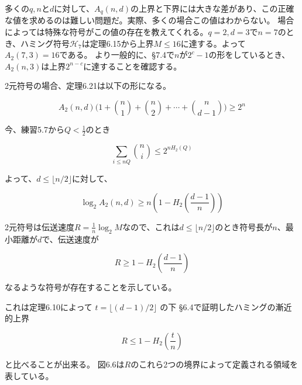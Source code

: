 \documentclass[12pt,a4paper]{article}
\begin{document}
      多くの$q, n$と$d$に対して、$A_q (n, d)$の上界と下界には大きな差があり、この正確な値を求めるのは難しい問題だ。実際、多くの場合この値はわからない。
      場合によっては特殊な符号がこの値の存在を教えてくれる。$q = 2, d = 3$で$n = 7$のとき、ハミング符号$\mathcal{H}_7$は定理6.15から上界$M \leq 16$に達する。よって$A_2 (7, 3) = 16$である。
      より一般的に、\S 7.4で$n$が$2^c - 1$の形をしているとき、$A_2(n, 3)$は上界$2^{n - c}$に達することを確認する。

      2元符号の場合、定理6.21は以下の形になる。

      \[ A_2(n, d) \big( 1 + \binom n1 + \binom n2 + \cdots + \binom{n}{d - 1} \big) \geq 2^n \]

      \noindent 今、練習5.7から$Q < \frac 12$のとき

      \[ \underset{i \leq nQ}{\sum} \binom ni \leq 2^{nH_2 (Q)} \]

      \noindent よって、$d \leq \lfloor n / 2 \rfloor$に対して、

      \[ \log_2 A_2(n, d) \geq n(1 - H_2 (\frac{d - 1}{n})) \]

      \noindent 2元符号は伝送速度$R = \frac 1n \log_2 M$なので、これは$d \leq \lfloor n / 2 \rfloor$のとき符号長が$n$、最小距離が$d$で、伝送速度が

      \[ R \geq 1 - H_2 ( \frac{d - 1}{n}) \]

      \noindent なるような符号が存在することを示している。

      これは定理6.10によって $t = \lfloor (d - 1) / 2 \rfloor$ の下 \S 6.4で証明したハミングの漸近的上界

      \[ R \leq 1 - H_2 (\frac tn ) \]

      \noindent と比べることが出来る。
      \noindent 図6.6は$R$のこれら2つの境界によって定義される領域を表している。
\end{document}
